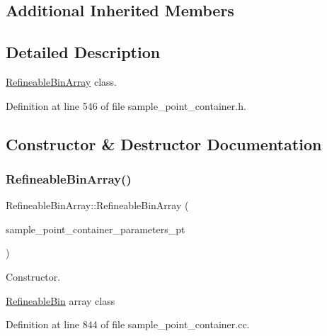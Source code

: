 \subsection*{Additional Inherited Members}


\subsection{Detailed Description}
\hyperlink{classRefineableBinArray}{Refineable\+Bin\+Array} class. 

Definition at line 546 of file sample\+\_\+point\+\_\+container.\+h.



\subsection{Constructor \& Destructor Documentation}
\mbox{\label{classRefineableBinArray_ae8f20e18970ec50ea92ea975ed3b1f6e}} 
\subsubsection{\texorpdfstring{Refineable\+Bin\+Array()}{RefineableBinArray()}\hspace{0.1cm}{\footnotesize\ttfamily [1/2]}}
{\footnotesize\ttfamily Refineable\+Bin\+Array\+::\+Refineable\+Bin\+Array (\begin{DoxyParamCaption}\item[{Sample\+Point\+Container\+Parameters $\ast$}]{sample\+\_\+point\+\_\+container\+\_\+parameters\+\_\+pt }\end{DoxyParamCaption})}



Constructor. 

\hyperlink{classRefineableBin}{Refineable\+Bin} array class 

Definition at line 844 of file sample\+\_\+point\+\_\+container.\+cc.



